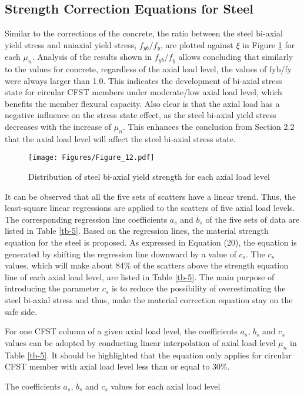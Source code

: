 \documentclass[12pt,a4]{article}
\begin{document}
	\subsection{Strength Correction Equations for Steel}
	Similar to the corrections of the concrete, the ratio between the steel bi-axial yield stress and uniaxial yield stress, $f_{yb}/f_y$, are plotted against $ξ$ in Figure \ref{fig-11} for each $μ_n$. Analysis of the results shown in $f_{yb}/f_y$ allows concluding that similarly to the values for concrete, regardless of the axial load level, the values of fyb/fy were always larger than 1.0. This indicates the development of bi-axial stress state for circular CFST members under moderate/low axial load level, which benefits the member flexural capacity. Also clear is that the axial load has a negative influence on the stress state effect, as the steel bi-axial yield stress decreases with the increase of $μ_n$. This enhances the conclusion from Section 2.2 that the axial load level will affect the steel bi-axial stress state.
	\par
	\begin{figure}[h]
		\centering
		\texttt{[image: Figures/Figure\_12.pdf]}
		\caption{Distribution of steel bi-axial yield strength for each axial load level}
		\label{fig-11}
	\end{figure}
	\par
	It can be observed that all the five sets of scatters have a linear trend. Thus, the least-square linear regressions are applied to the scatters of five axial load levels. The corresponding regression line coefficients $a_s$ and $b_s$ of the five sets of data are listed in Table \ref{tb-5}. Based on the regression lines, the material strength equation for the steel is proposed. As expressed in Equation (20), the equation is generated by shifting the regression line downward by a value of $c_s$. The $c_s$ values, which will make about 84\% of the scatters above the strength equation line of each axial load level, are listed in Table \ref{tb-5}. The main purpose of introducing the parameter $c_s$ is to reduce the possibility of overestimating the steel bi-axial stress and thus, make the material correction equation stay on the safe side.
	\par
	For one CFST column of a given axial load level, the coefficients $a_s$, $b_s$ and $c_s$ values can be adopted by conducting linear interpolation of axial load level $μ_n$ in Table \ref{tb-5}. It should be highlighted that the equation only applies for circular CFST member with axial load level less than or equal to 30\%.
	\par
	\begin{table}
		\caption{The coefficients $a_s$, $b_s$ and $c_s$ values for each axial load level}
		\label{tb-5}
	\end{table}
	\par
\end{document}
